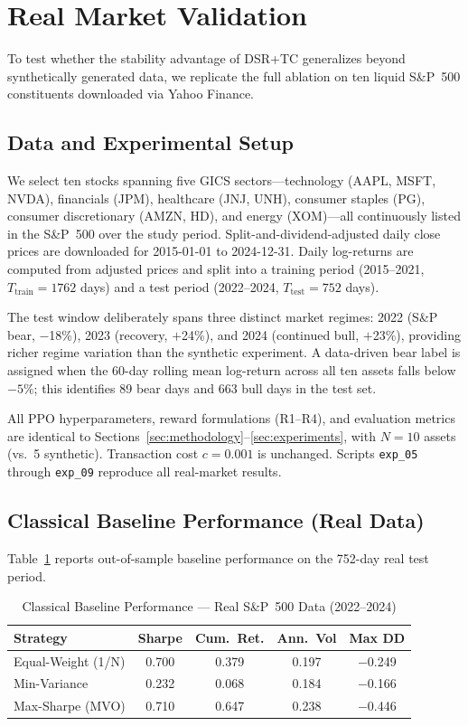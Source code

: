 \documentclass[conference]{IEEEtran}
\begin{document}
\section{Real Market Validation}
\label{sec:realmarket}

To test whether the stability advantage of DSR+TC generalizes beyond
synthetically generated data, we replicate the full ablation on ten
liquid S\&P~500 constituents downloaded via Yahoo Finance.

\subsection{Data and Experimental Setup}

We select ten stocks spanning five GICS sectors—technology (AAPL, MSFT,
NVDA), financials (JPM), healthcare (JNJ, UNH), consumer staples (PG),
consumer discretionary (AMZN, HD), and energy (XOM)—all continuously
listed in the S\&P~500 over the study period.
Split-and-dividend-adjusted daily close prices are downloaded for
2015-01-01 to 2024-12-31. Daily log-returns are computed from adjusted
prices and split into a training period (2015–2021, $T_{\mathrm{train}}=1762$
days) and a test period (2022–2024, $T_{\mathrm{test}}=752$ days).

The test window deliberately spans three distinct market regimes:
2022 (S\&P bear, $-$18\%), 2023 (recovery, $+$24\%), and 2024
(continued bull, $+$23\%), providing richer regime variation than the
synthetic experiment. A data-driven bear label is assigned when the
60-day rolling mean log-return across all ten assets falls below
$-5\%$; this identifies 89 bear days and 663 bull days in the test set.

All PPO hyperparameters, reward formulations (R1--R4), and evaluation
metrics are identical to Sections~\ref{sec:methodology}--\ref{sec:experiments},
with $N=10$ assets (vs.~5 synthetic). Transaction cost $c=0.001$ is
unchanged. Scripts \texttt{exp\_05} through \texttt{exp\_09} reproduce
all real-market results.

\subsection{Classical Baseline Performance (Real Data)}

Table~\ref{tab:real_baselines} reports out-of-sample baseline performance
on the 752-day real test period.

\begin{table}[t]
\caption{Classical Baseline Performance — Real S\&P~500 Data (2022--2024)}
\label{tab:real_baselines}
\centering
\begin{tabular}{lcccc}
\toprule
Strategy & Sharpe & Cum.\ Ret. & Ann.\ Vol & Max DD \\
\midrule
Equal-Weight (1/N) & 0.700 & 0.379 & 0.197 & $-$0.249 \\
Min-Variance       & 0.232 & 0.068 & 0.184 & $-$0.166 \\
Max-Sharpe (MVO)   & 0.710 & 0.647 & 0.238 & $-$0.446 \\
\bottomrule
\end{tabular}
\end{table}
\end{document}
